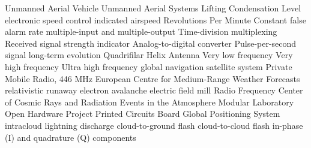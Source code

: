 {Unmanned Aerial Vehicle}
 {Unmanned Aerial Systems}
 {Lifting Condensation Level}
 {electronic speed control}
 {indicated airspeed}
 {Revolutions Per Minute}
 {Constant false alarm rate}
 {multiple-input and multiple-output}
 {Time-division multiplexing}
 {Received signal strength indicator}
 {Analog-to-digital converter}
 {Pulse-per-second signal}
 {long-term evolution}
 {Quadrifilar Helix Antenna}
 {Very low frequency}
 {Very high frequency}
 {Ultra high frequency}
 {global navigation satellite system}
 {Private Mobile Radio, 446 MHz}
 {European Centre for Medium-Range Weather Forecasts}
 {relativistic runaway electron avalanche}
 {electric field mill}
 {Radio Frequency}
 {Center of Cosmic Rays and Radiation Events in the Atmosphere}
 {Modular Laboratory Open Hardware Project}
 {Printed Circuits Board}
 {Global Positioning System}
 {intracloud lightning discharge}
 {cloud-to-ground flash}
 {cloud-to-cloud flash}
 {in-phase (I) and quadrature (Q) components}


